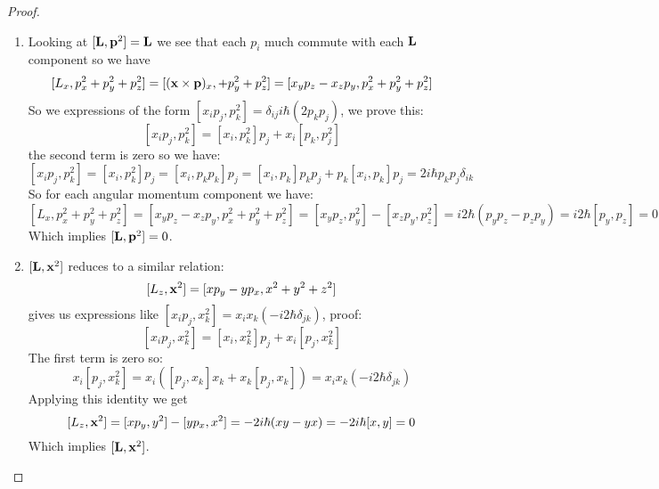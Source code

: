 \begin{proof}

    \begin{enumerate}
        \item Looking at $[\mathbf{L}, \mathbf{p}^2] = \mathbf{L}$ we see that each
                $p_i$ much commute with each $\mathbf{L}$ component so we
                have
            \[
                [L_x, p^2_x + p^2_y + p^2_z] = [(\mathbf{x}\times\mathbf{p})_x, +
                p^2_y + p^2_z] = [x_y p_z - x_z p_y,  p^2_x + p^2_y +
                p^2_z]
            \]
            So we expressions of the form $[x_i p_j, p^2_k] =
            \delta_{ij} i \hbar (2 p_k p_j)$, we prove this:
            \[
                [x_i p_j, p^2_k] = [x_i, p^2_k]p_j + x_i [p_k, p^2_j]
            \]
            the second term is zero so we have:
            \[
                [x_i p_j, p^2_k] = [x_i, p^2_k]p_j = [x_i, p_k p_k]p_j =
                [x_i, p_k]p_k p_j + p_k[ x_i, p_k] p_j = 2 i \hbar p_k
                p_j \delta_{ik}
            \]
            So for each angular momentum component we have:
            \[
                [L_x, p^2_x + p^2_y + p^2_z] = [x_y p_z - x_z p_y,
                p^2_x + p^2_y + p^2_z] = [x_y p_z, p^2_y] - [x_z p_y,
                p^2_z] = i2\hbar (p_y p_z  - p_z p_y) = i2\hbar [p_y,
                p_z] = 0
            \]
            Which implies $[\mathbf{L}, \mathbf{p}^2] = 0$.

        \item $[ \mathbf{L}, \mathbf{x}^2]$ reduces to a similar relation:
            \[
                [L_z, \mathbf{x}^2] = [xp_y - yp_x, x^2 + y^2 + z^2]
            \]
            gives us expressions like $[x_i p_j, x^2_{k}] = x_i x_k (-i
            2 \hbar \delta_{jk} )$, proof:
            \[
                [x_i p_j, x^2_k] = [x_i, x^2_k]p_j + x_i [p_j, x^2_k]
            \]
            The first term is zero so:
            \[
                x_i [p_j, x^2_k] = x_i ([p_j, x_k] x_k + x_k [p_j, x_k]) =
                x_i x_k (- i 2 \hbar \delta_{jk})
            \]
            Applying this identity we get
            \[
                [L_z, \mathbf{x}^2] = [xp_y, y^2] - [y p_x, x^2] =
                -2i\hbar(xy- yx) = -2i\hbar [x, y] = 0
            \]
            Which implies $[\mathbf{L}, \mathbf{x}^2]$.

    \end{enumerate}

\end{proof}



